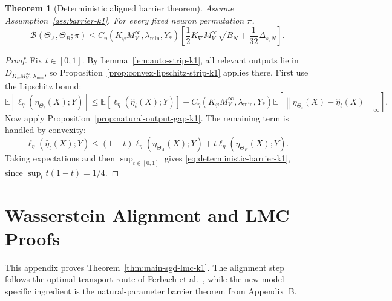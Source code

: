\documentclass[11pt]{article}
\newtheorem{theorem}{Theorem}
\theoremstyle{definition}
\newcommand{\E}{\mathbb{E}}
\newcommand{\norm}[1]{\left\lVert #1 \right\rVert}
\newcommand{\cB}{\mathcal{B}}
\begin{document}
\begin{theorem}[Deterministic aligned barrier theorem]
\label{thm:deterministic-lmc-k1}
Assume Assumption~\ref{ass:barrier-k1}. For every fixed neuron permutation
$\pi$,
\begin{equation}
  \cB(\Theta_A,\Theta_B;\pi)
  \le
  C_\eta(K_\varphi M_V^\infty,\lambda_{\min},Y_\ast)
  \left[
    \frac12 K_{\nabla}M_V^\infty\sqrt{B_N}
    +
    \frac1{32}\Delta_{s,N}
  \right].
  \label{eq:deterministic-barrier-k1}
\end{equation}
\end{theorem}

\begin{proof}
Fix $t\in[0,1]$. By Lemma~\ref{lem:auto-strip-k1}, all relevant outputs lie in
$D_{K_\varphi M_V^\infty,\lambda_{\min}}$, so
Proposition~\ref{prop:convex-lipschitz-strip-k1} applies there. First use the
Lipschitz bound:
\[
  \E[\ell_\eta(\eta_{\Theta_t}(X);Y)]
  \le
  \E[\ell_\eta(\hat\eta_t(X);Y)]
  +
  C_\eta(K_\varphi M_V^\infty,\lambda_{\min},Y_\ast)
  \E[\norm{\eta_{\Theta_t}(X)-\hat\eta_t(X)}_\infty].
\]
Now apply Proposition~\ref{prop:natural-output-gap-k1}. The remaining term is
handled by convexity:
\[
  \ell_\eta(\hat\eta_t(X);Y)
  \le
  (1-t)\ell_\eta(\eta_{\Theta_A}(X);Y)
  +
  t\ell_\eta(\eta_{\Theta_B}(X);Y).
\]
Taking expectations and then $\sup_{t\in[0,1]}$ gives
\eqref{eq:deterministic-barrier-k1}, since $\sup_t t(1-t)=1/4$.
\end{proof}

\section{Wasserstein Alignment and LMC Proofs}

This appendix proves Theorem~\ref{thm:main-sgd-lmc-k1}. The alignment step
follows the optimal-transport route of Ferbach et al.~\cite{Ferbach2024}, while
the new model-specific ingredient is the natural-parameter barrier theorem from
Appendix~B.
\end{document}
